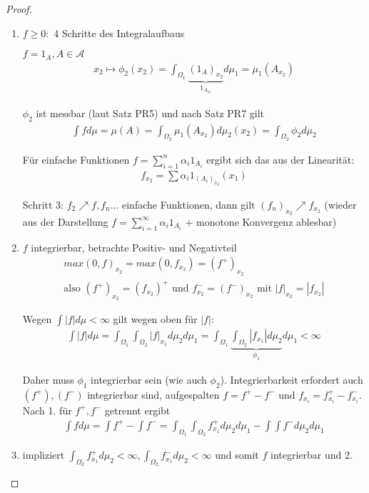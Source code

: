 \documentclass[]{article}
\begin{document}
\begin{proof}
	\begin{enumerate}
		\item $f \geq 0:$ 4 Schritte des Integralaufbaus
		
		$f = 1_A, A \in \mathcal{A}$
		\begin{align*}
			x_2 \mapsto \phi_2(x_2) = \int_{\Omega_1} \underbrace{(1_A)_{x_2}}_{1_{A_{x_2}}} d\mu_1 = \mu_1(A_{x_2})
		\end{align*}
	
		$\phi_2$ ist messbar (laut Satz PR5) und nach Satz PR7 gilt
		\begin{align*}
			\int f d\mu = \mu(A) = \int_{\Omega_2} \mu_1(A_{x_2}) d\mu_2(x_2) = \int_{\Omega_2} \phi_2 d\mu_2
		\end{align*}
	
		Für einfache Funktionen $f = \sum_{i=1}^{n}\alpha_i 1_{A_i}$ ergibt sich das aus der Linearität:
		\begin{align*}
			f_{x_2} = \sum \alpha_i 1_{(A_i)_{x_2}}(x_1)
		\end{align*}
	
		Schritt 3: $f_2\nearrow f, f_n$... einfache Funktionen, dann gilt $(f_n)_{x_2}\nearrow f_{x_2}$ (wieder aus der Darstellung $f=\sum_{i=1}^{\infty}\alpha_i 1_{A_i}$ + monotone Konvergenz ablesbar)
		
		\item $f$ integrierbar, betrachte Positiv- und Negativteil
		\begin{align*}
			max(0,f)_{x_2} = max(0, f_{x_2}) = (f^+)_{x_2}\\
			\text{also } (f^+)_{x_2} = (f_{x_2})^+ \text{ und } f_{x_2}^- = (f^-)_{x_2} \text{ mit } |f|_{x_2} = |f_{x_2}|
		\end{align*}
	
		Wegen $\int |f| d\mu < \infty$ gilt wegen oben für $|f|$:
		\begin{align*}
			\int |f| d\mu = \int_{\Omega_1} \int_{\Omega_2} |f|_{x_1} d\mu_2 d\mu_1 = \int_{\Omega_1} \underbrace{\int_{\Omega_2} |f_{x_1}| d\mu_2}_{\phi_1} d\mu_1 < \infty
		\end{align*}
	
		Daher muss $\phi_1$ integrierbar sein (wie auch $\phi_2$). Integrierbarkeit erfordert auch $(f^+), (f^-)$ integrierbar sind, aufgespalten $f = f^+-f^-$ und $f_{x_i} = f_{x_i}^+ - f_{x_i}^-$. Nach 1. für $f^+, f^-$ getrennt ergibt
		\begin{align*}
			\int f d\mu = \int f^+ - \int f^- = \int_{\Omega_1} \int_{\Omega_2} f_{x_1}^+ d\mu_2 d\mu_1 - \int\int f^- d\mu_2 d\mu_1
		\end{align*}
	
		\item impliziert $\int_{\Omega_2} f_{x_1}^+ d\mu_2 < \infty, \int_{\Omega_2} f_{x_1}^- d\mu_2 < \infty$ und somit $f$ integrierbar und 2.
	\end{enumerate}
\end{proof}
\end{document}
